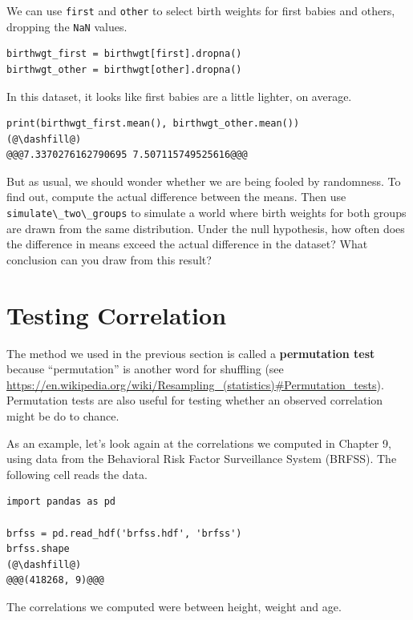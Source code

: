 We can use \passthrough{\lstinline!first!} and
\passthrough{\lstinline!other!} to select birth weights for first babies
and others, dropping the \passthrough{\lstinline!NaN!} values.

\begin{lstlisting}[]
birthwgt_first = birthwgt[first].dropna()
birthwgt_other = birthwgt[other].dropna()
\end{lstlisting}

In this dataset, it looks like first babies are a little lighter, on
average.

\begin{lstlisting}[]
print(birthwgt_first.mean(), birthwgt_other.mean())
(@\dashfill@)
@@@7.3370276162790695 7.507115749525616@@@
\end{lstlisting}

But as usual, we should wonder whether we are being fooled by
randomness. To find out, compute the actual difference between the
means. Then use \passthrough{\lstinline!simulate\_two\_groups!} to
simulate a world where birth weights for both groups are drawn from the
same distribution. Under the null hypothesis, how often does the
difference in means exceed the actual difference in the dataset? What
conclusion can you draw from this result?

\hypertarget{testing-correlation}{%
\section{Testing Correlation}\label{testing-correlation}}

The method we used in the previous section is called a
\textbf{permutation test} because ``permutation'' is another word for
shuffling (see
\url{https://en.wikipedia.org/wiki/Resampling_(statistics)\#Permutation_tests}).
Permutation tests are also useful for testing whether an observed
correlation might be do to chance.

As an example, let's look again at the correlations we computed in
Chapter 9, using data from the Behavioral Risk Factor Surveillance
System (BRFSS). The following cell reads the data.

\begin{lstlisting}[]
import pandas as pd

brfss = pd.read_hdf('brfss.hdf', 'brfss')
brfss.shape
(@\dashfill@)
@@@(418268, 9)@@@
\end{lstlisting}

The correlations we computed were between height, weight and age.

